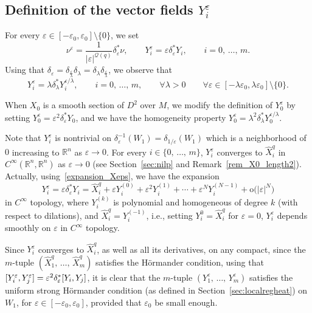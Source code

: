 \documentclass[10pt]{amsart}
\theoremstyle{definition}\newtheorem{defi}[theo]{Definition}\newtheorem{rema}[theo]{Remark}\newtheorem{exam}[theo]{Example}\newtheorem{exem}[theo]{Example}\newtheorem{nota}[theo]{Notation}
\newcommand*\R{\mathbb{R}}
\newcommand{\calQ}{\mathcal{Q}}
\newcommand{\rmo}{\mathrm{o}}
\let\oldforall\forall
\renewcommand*{\forall}{\mathrel{\oldforall}}
\begin{document}
\subsection{Definition of the vector fields \texorpdfstring{$Y_i^\varepsilon$}{Yi varepsilon}}
For every $\varepsilon\in[-\varepsilon_0,\varepsilon_0]\setminus\{0\}$, we set
\begin{equation}\label{defYieps}
\nu^\varepsilon = \frac{1}{\vert\varepsilon\vert^{\calQ(q)}}\delta_\varepsilon^*\nu,\qquad Y^\varepsilon_i = \varepsilon\delta_\varepsilon^*Y_i,\qquad i=0,\,\ldots,\,m.
\end{equation}
Using that $\delta_\varepsilon=\delta_{\frac{\varepsilon}{\lambda}}\delta_\lambda=\delta_\lambda\delta_{\frac{\varepsilon}{\lambda}}$, we observe that
\begin{equation}\label{homog_deltaY}
Y_i^\varepsilon = \lambda\delta_\lambda^* Y_i^{\varepsilon/\lambda},\qquad i=0,\,\ldots,\,m, \qquad \forall\lambda>0\qquad\forall\varepsilon\in[-\lambda\varepsilon_0,\lambda\varepsilon_0]\setminus\{0\}.
\end{equation}

When $X_0$ is a smooth section of $D^2$ over $M$, we modify the definition of $Y^\varepsilon_0$ by setting $Y^\varepsilon_0 = \varepsilon^2\delta_\varepsilon^*Y_0$, and we have the homogeneity property $Y_0^\varepsilon = \lambda^2\delta_\lambda^* Y_0^{\varepsilon/\lambda}$.

Note that $Y_i^\varepsilon$ is nontrivial on $\delta_\varepsilon^{-1}(W_1)=\delta_{1/\varepsilon}(W_1)$ which is a neighborhood of $0$ increasing to $\R^n$ as $\varepsilon\rightarrow 0$. For every $i\in\{0,\,\ldots,\,m\}$, $Y_i^\varepsilon$ converges to $\widehat{X}_i^{q}$ in $C^\infty(\R^n,\R^n)$ as $\varepsilon\rightarrow 0$ (see Section~\ref{sec:nilp} and Remark~\ref{rem_X0_length2}). Actually, using~\eqref{expansion_Xeps}, we have the expansion
\begin{equation}\label{expansion_Yieps}
Y_i^\varepsilon = \varepsilon \delta_\varepsilon^* Y_i = \widehat{X}_i^{q} + \varepsilon Y_i^{(0)} + \varepsilon^2 Y_i^{(1)} + \cdots + \varepsilon^N Y_i^{(N-1)} + \rmo\big(\vert\varepsilon\vert^N\big)
\end{equation}
in $C^\infty$ topology, where $Y_i^{(k)}$ is polynomial and homogeneous of degree $k$ (with respect to dilations), and $\widehat{X}_i^{q} = Y_i^{(-1)}$, i.e., setting $Y^0_i=\widehat{X}_i^{q}$ for $\varepsilon=0$, $Y^\varepsilon_i$ depends smoothly on $\varepsilon$ in $C^\infty$ topology.

Since $Y_i^\varepsilon$ converges to $\widehat{X}_i^{q}$, as well as all its derivatives, on any compact, since the $m$-tuple $(\widehat{X}_1^{q},\,\ldots,\,\widehat{X}_m^{q})$ satisfies the H\"ormander condition, using that $[Y_i^\varepsilon,Y_j^\varepsilon]\linebreak= \varepsilon^2 \delta_\varepsilon^* [Y_i,Y_j]$, it is clear that the $m$-tuple $(Y_1^\varepsilon,\,\ldots,\,Y_m^\varepsilon)$ satisfies the uniform strong H\"ormander condition (as defined in Section~\ref{sec:localregheat}) on $W_1$, for $\varepsilon\in[-\varepsilon_0,\varepsilon_0]$, provided that $\varepsilon_0$ be small enough.
\end{document}
